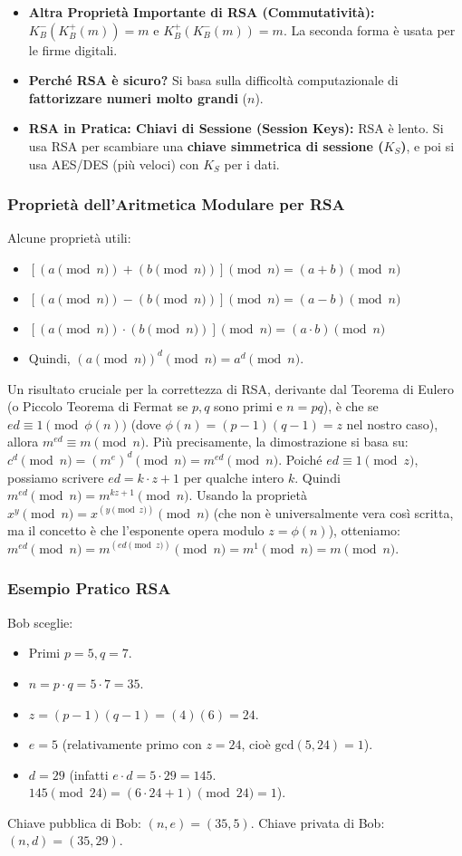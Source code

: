 \begin{itemize}
\begin{itemize}
    \end{itemize}
    \item \textbf{Altra Proprietà Importante di RSA (Commutatività):}
    $K_B^-(K_B^+(m)) = m$ e $K_B^+(K_B^-(m)) = m$. La seconda forma è usata per le firme digitali.
    \item \textbf{Perché RSA è sicuro?} Si basa sulla difficoltà computazionale di \textbf{fattorizzare numeri molto grandi} ($n$).
    \item \textbf{RSA in Pratica: Chiavi di Sessione (Session Keys):}
    RSA è lento. Si usa RSA per scambiare una \textbf{chiave simmetrica di sessione ($K_S$)}, e poi si usa AES/DES (più veloci) con $K_S$ per i dati.
\end{itemize}

\subsubsection{Proprietà dell'Aritmetica Modulare per RSA}
\label{ssubsec:prop_mod_rsa}
Alcune proprietà utili:
\begin{itemize}
    \item $[(a \pmod n) + (b \pmod n)] \pmod n = (a+b) \pmod n$
    \item $[(a \pmod n) - (b \pmod n)] \pmod n = (a-b) \pmod n$
    \item $[(a \pmod n) \cdot (b \pmod n)] \pmod n = (a \cdot b) \pmod n$
    \item Quindi, $(a \pmod n)^d \pmod n = a^d \pmod n$.
\end{itemize}
Un risultato cruciale per la correttezza di RSA, derivante dal Teorema di Eulero (o Piccolo Teorema di Fermat se $p,q$ sono primi e $n=pq$), è che se $ed \equiv 1 \pmod{\phi(n)}$ (dove $\phi(n)=(p-1)(q-1)=z$ nel nostro caso), allora $m^{ed} \equiv m \pmod n$.
Più precisamente, la dimostrazione si basa su:
$c^d \pmod n = (m^e)^d \pmod n = m^{ed} \pmod n$.
Poiché $ed \equiv 1 \pmod z$, possiamo scrivere $ed = k \cdot z + 1$ per qualche intero $k$.
Quindi $m^{ed} \pmod n = m^{kz+1} \pmod n$.
Usando la proprietà $x^y \pmod n = x^{(y \pmod z)} \pmod n$ (che non è universalmente vera così scritta, ma il concetto è che l'esponente opera modulo $z=\phi(n)$), otteniamo:
$m^{ed} \pmod n = m^{(ed \pmod z)} \pmod n = m^1 \pmod n = m \pmod n$.

\subsubsection{Esempio Pratico RSA}
\label{ssubsec:esempio_rsa}
Bob sceglie:
\begin{itemize}
    \item Primi $p=5, q=7$.
    \item $n = p \cdot q = 5 \cdot 7 = 35$.
    \item $z = (p-1)(q-1) = (4)(6) = 24$.
    \item $e=5$ (relativamente primo con $z=24$, cioè $\text{gcd}(5,24)=1$).
    \item $d=29$ (infatti $e \cdot d = 5 \cdot 29 = 145$. $145 \pmod{24} = (6 \cdot 24 + 1) \pmod{24} = 1$).
\end{itemize}
Chiave pubblica di Bob: $(n,e) = (35,5)$.
Chiave privata di Bob: $(n,d) = (35,29)$.

